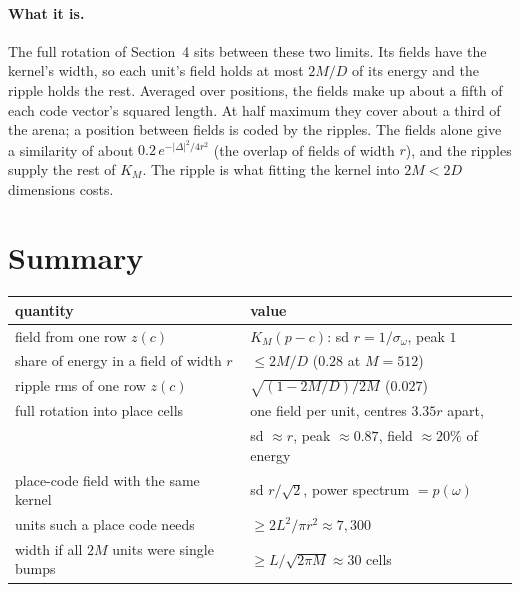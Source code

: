 \documentclass[11pt]{article}
\begin{document}
\paragraph{What it is.} The full rotation of Section~4 sits between these two limits. Its fields
have the kernel's width, so each unit's field holds at most $2M/D$ of its energy and the ripple
holds the rest. Averaged over positions, the fields make up about a fifth of each code vector's
squared length. At half maximum they cover about a third of the arena; a position between fields
is coded by the ripples. The fields alone give a similarity of about
$0.2\,e^{-|\Delta|^2/4r^2}$ (the overlap of fields of width $r$), and the ripples supply the rest of
$K_M$. The ripple is what fitting the kernel into $2M < 2D$ dimensions costs.

\section{Summary}

\begin{center}
\begin{tabular}{ll}
  \toprule
  quantity & value \\
  \midrule
  field from one row $z(c)$ & $K_M(p - c)$: sd $r = 1/\sigma_\omega$, peak $1$ \\
  share of energy in a field of width $r$ & $\le 2M/D$ ($0.28$ at $M = 512$) \\
  ripple rms of one row $z(c)$ & $\sqrt{(1 - 2M/D)/2M}$ ($0.027$) \\
  full rotation into place cells & one field per unit, centres $3.35r$ apart, \\
  & sd $\approx r$, peak $\approx 0.87$, field $\approx 20\%$ of energy \\
  place-code field with the same kernel & sd $r/\sqrt2$, power spectrum $= p(\omega)$ \\
  units such a place code needs & $\ge 2L^2/\pi r^2 \approx 7{,}300$ \\
  width if all $2M$ units were single bumps & $\ge L/\sqrt{2\pi M} \approx 30$ cells \\
  \bottomrule
\end{tabular}
\end{center}
\end{document}
